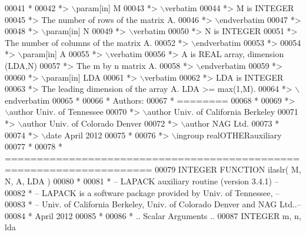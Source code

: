 \begin{DoxyCode}
00041 \textcolor{comment}{*}
00042 \textcolor{comment}{*> \(\backslash\)param[in] M}
00043 \textcolor{comment}{*> \(\backslash\)verbatim}
00044 \textcolor{comment}{*>          M is INTEGER}
00045 \textcolor{comment}{*>          The number of rows of the matrix A.}
00046 \textcolor{comment}{*> \(\backslash\)endverbatim}
00047 \textcolor{comment}{*>}
00048 \textcolor{comment}{*> \(\backslash\)param[in] N}
00049 \textcolor{comment}{*> \(\backslash\)verbatim}
00050 \textcolor{comment}{*>          N is INTEGER}
00051 \textcolor{comment}{*>          The number of columns of the matrix A.}
00052 \textcolor{comment}{*> \(\backslash\)endverbatim}
00053 \textcolor{comment}{*>}
00054 \textcolor{comment}{*> \(\backslash\)param[in] A}
00055 \textcolor{comment}{*> \(\backslash\)verbatim}
00056 \textcolor{comment}{*>          A is REAL array, dimension (LDA,N)}
00057 \textcolor{comment}{*>          The m by n matrix A.}
00058 \textcolor{comment}{*> \(\backslash\)endverbatim}
00059 \textcolor{comment}{*>}
00060 \textcolor{comment}{*> \(\backslash\)param[in] LDA}
00061 \textcolor{comment}{*> \(\backslash\)verbatim}
00062 \textcolor{comment}{*>          LDA is INTEGER}
00063 \textcolor{comment}{*>          The leading dimension of the array A. LDA >= max(1,M).}
00064 \textcolor{comment}{*> \(\backslash\)endverbatim}
00065 \textcolor{comment}{*}
00066 \textcolor{comment}{*  Authors:}
00067 \textcolor{comment}{*  ========}
00068 \textcolor{comment}{*}
00069 \textcolor{comment}{*> \(\backslash\)author Univ. of Tennessee }
00070 \textcolor{comment}{*> \(\backslash\)author Univ. of California Berkeley }
00071 \textcolor{comment}{*> \(\backslash\)author Univ. of Colorado Denver }
00072 \textcolor{comment}{*> \(\backslash\)author NAG Ltd. }
00073 \textcolor{comment}{*}
00074 \textcolor{comment}{*> \(\backslash\)date April 2012}
00075 \textcolor{comment}{*}
00076 \textcolor{comment}{*> \(\backslash\)ingroup realOTHERauxiliary}
00077 \textcolor{comment}{*}
00078 \textcolor{comment}{*  =====================================================================}
00079 \textcolor{keyword}{      INTEGER }\textcolor{keyword}{FUNCTION }ilaslr( M, N, A, LDA )
00080 \textcolor{comment}{*}
00081 \textcolor{comment}{*  -- LAPACK auxiliary routine (version 3.4.1) --}
00082 \textcolor{comment}{*  -- LAPACK is a software package provided by Univ. of Tennessee,    --}
00083 \textcolor{comment}{*  -- Univ. of California Berkeley, Univ. of Colorado Denver and NAG Ltd..--}
00084 \textcolor{comment}{*     April 2012}
00085 \textcolor{comment}{*}
00086 \textcolor{comment}{*     .. Scalar Arguments ..}
00087       \textcolor{keywordtype}{INTEGER}            m, n, lda

\end{DoxyCode}
